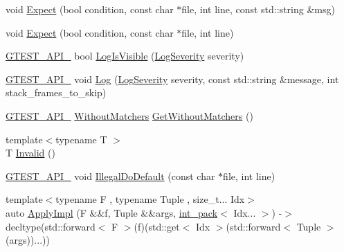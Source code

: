 \begin{DoxyCompactItemize}
\item 
void \mbox{\hyperlink{namespacetesting_1_1internal_ad93379317e10862a77b9fb90aa96e083}{Expect}} (bool condition, const char $\ast$file, int line, const std\+::string \&msg)
\item 
void \mbox{\hyperlink{namespacetesting_1_1internal_a0dfe8a755bd02aa5ea162764b61a9d97}{Expect}} (bool condition, const char $\ast$file, int line)
\item 
\mbox{\hyperlink{_obj__test_2lib_2googletest-release-1_88_81_2googletest_2include_2gtest_2internal_2gtest-port_8h_aa73be6f0ba4a7456180a94904ce17790}{G\+T\+E\+S\+T\+\_\+\+A\+P\+I\+\_\+}} bool \mbox{\hyperlink{namespacetesting_1_1internal_a69ffdba5ee36743e88d8f89b79e566ff}{Log\+Is\+Visible}} (\mbox{\hyperlink{namespacetesting_1_1internal_a203d1a8a2147a53d12bbdae40d443914}{Log\+Severity}} severity)
\item 
\mbox{\hyperlink{_obj__test_2lib_2googletest-release-1_88_81_2googletest_2include_2gtest_2internal_2gtest-port_8h_aa73be6f0ba4a7456180a94904ce17790}{G\+T\+E\+S\+T\+\_\+\+A\+P\+I\+\_\+}} void \mbox{\hyperlink{namespacetesting_1_1internal_a8a57ce0412334a3f487bbaa8321febbe}{Log}} (\mbox{\hyperlink{namespacetesting_1_1internal_a203d1a8a2147a53d12bbdae40d443914}{Log\+Severity}} severity, const std\+::string \&message, int stack\+\_\+frames\+\_\+to\+\_\+skip)
\item 
\mbox{\hyperlink{_obj__test_2lib_2googletest-release-1_88_81_2googletest_2include_2gtest_2internal_2gtest-port_8h_aa73be6f0ba4a7456180a94904ce17790}{G\+T\+E\+S\+T\+\_\+\+A\+P\+I\+\_\+}} \mbox{\hyperlink{classtesting_1_1internal_1_1_without_matchers}{Without\+Matchers}} \mbox{\hyperlink{namespacetesting_1_1internal_ad4e02ea077a717f95a10a03c10272f1c}{Get\+Without\+Matchers}} ()
\item 
{\footnotesize template$<$typename T $>$ }\\T \mbox{\hyperlink{namespacetesting_1_1internal_a3316c24e8a79f5def3e85d763ae50854}{Invalid}} ()
\item 
\mbox{\hyperlink{_obj__test_2lib_2googletest-release-1_88_81_2googletest_2include_2gtest_2internal_2gtest-port_8h_aa73be6f0ba4a7456180a94904ce17790}{G\+T\+E\+S\+T\+\_\+\+A\+P\+I\+\_\+}} void \mbox{\hyperlink{namespacetesting_1_1internal_aa67e1e9d28122eedffbb7b6636824f2d}{Illegal\+Do\+Default}} (const char $\ast$file, int line)
\item 
{\footnotesize template$<$typename F , typename Tuple , size\+\_\+t... Idx$>$ }\\auto \mbox{\hyperlink{namespacetesting_1_1internal_a3a3b201170370a28f0acaf0de785cded}{Apply\+Impl}} (F \&\&f, Tuple \&\&args, \mbox{\hyperlink{structtesting_1_1internal_1_1int__pack}{int\+\_\+pack}}$<$ Idx... $>$) -\/$>$ decltype(std\+::forward$<$ F $>$(f)(std\+::get$<$ Idx $>$(std\+::forward$<$ Tuple $>$(args))...))

\end{DoxyCompactItemize}
